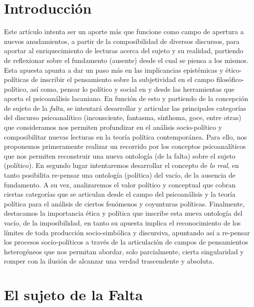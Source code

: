 
\section{Introducción}

Este artículo intenta ser un aporte más que funcione como campo de apertura a nuevos anudamientos, a partir de la composibilidad de diversos discursos, para aportar al enriquecimiento de lecturas acerca del sujeto y su realidad, partiendo de reflexionar sobre el fundamento (ausente) desde el cual se piensa a los mismos. Esta apuesta apunta a dar un paso más en las implicancias epistémicas y ético-políticas de inscribir el pensamiento sobre la subjetividad en el campo filosófico-político, así como, pensar lo político y social en y desde las herramientas que aporta el psicoanálisis lacaniano. En función de esto y partiendo de la concepción de sujeto de la \emph{falta}, se intentará desarrollar y articular las principales categorías del discurso psicoanalítico (inconsciente, fantasma, sínthoma, goce, entre otras) que consideramos nos permiten profundizar en el análisis socio-político y composibilitar nuevas lecturas en la teoría política contemporánea. Para ello, nos proponemos primeramente realizar un recorrido por los conceptos psicoanalíticos que nos permiten reconstruir una nueva ontología (de la falta) sobre el sujeto (político). En segundo lugar intentaremos desarrollar el concepto de \emph{lo real}, en tanto posibilita re-pensar una ontología (política) del vacío, de la ausencia de fundamento. A su vez, analizaremos el valor político y conceptual que cobran ciertas categorías que se articulan desde el campo del psicoanálisis y la teoría política para el análisis de ciertos fenómenos y coyunturas políticas. Finalmente, destacamos la importancia ética y política que inscribe esta nueva ontología del vacío, de la imposibilidad, en tanto su apuesta implica el reconocimiento de los límites de toda producción socio-simbólica y discursiva, apuntando así a re-pensar los procesos socio-políticos a través de la articulación de campos de pensamientos heterogéneos que nos permitan abordar, solo parcialmente, cierta singularidad y romper con la ilusión de alcanzar una verdad trascendente y absoluta.

\section{El sujeto de la Falta}

